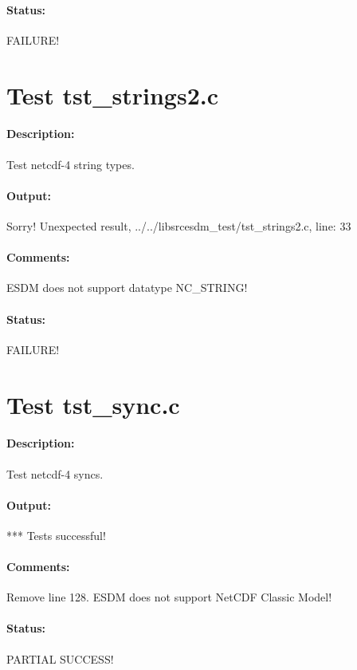 \paragraph{Status:} FAILURE!

\section{Test tst\_strings2.c}

\paragraph{Description:} Test netcdf-4 string types.

\paragraph{Output:} Sorry! Unexpected result, ../../libsrcesdm\_test/tst\_strings2.c, line: 33

\paragraph{Comments:} ESDM does not support datatype NC\_STRING!

\paragraph{Status:} FAILURE!

\section{Test tst\_sync.c}

\paragraph{Description:} Test netcdf-4 syncs.

\paragraph{Output:} *** Tests successful!

\paragraph{Comments:} Remove line 128. ESDM does not support NetCDF Classic Model!

\paragraph{Status:} PARTIAL SUCCESS!

